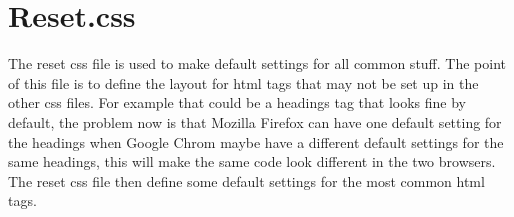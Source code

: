 \section{Reset.css}
The reset css file is used to make default settings for all common stuff. The point of this file is to define the layout for html tags that may not be set up in the other css files. For example that could be a headings tag that looks fine by default, the problem now is that Mozilla Firefox can have one default setting for the headings when Google Chrom maybe have a different default settings for the same headings, this will make the same code look different in the two browsers. The reset css file then define some default settings for the most common html tags.